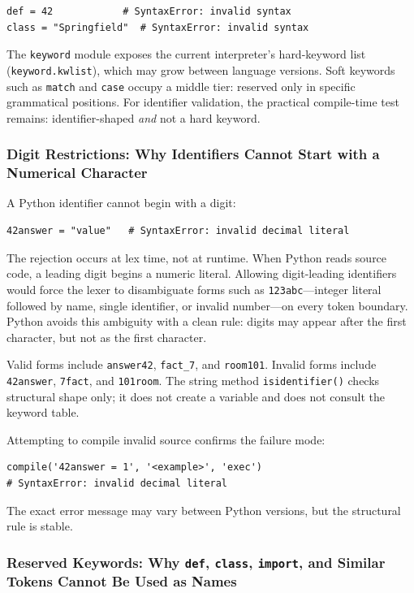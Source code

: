 \documentclass[a4paper,twoside]{report}
\begin{document}
\begin{verbatim}
def = 42            # SyntaxError: invalid syntax
class = "Springfield"  # SyntaxError: invalid syntax
\end{verbatim}

The \texttt{keyword} module exposes the current interpreter's hard-keyword list (\texttt{keyword.kwlist}), which may grow between language versions. Soft keywords such as \texttt{match} and \texttt{case} occupy a middle tier: reserved only in specific grammatical positions. For identifier validation, the practical compile-time test remains: identifier-shaped \emph{and} not a hard keyword.

\subsubsection{Digit Restrictions: Why Identifiers Cannot Start with a Numerical Character}

A Python identifier cannot begin with a digit:

\begin{verbatim}
42answer = "value"   # SyntaxError: invalid decimal literal
\end{verbatim}

The rejection occurs at lex time, not at runtime. When Python reads source code, a leading digit begins a numeric literal. Allowing digit-leading identifiers would force the lexer to disambiguate forms such as \texttt{123abc}---integer literal followed by name, single identifier, or invalid number---on every token boundary. Python avoids this ambiguity with a clean rule: digits may appear after the first character, but not as the first character.

Valid forms include \texttt{answer42}, \texttt{fact\_7}, and \texttt{room101}. Invalid forms include \texttt{42answer}, \texttt{7fact}, and \texttt{101room}. The string method \texttt{isidentifier()} checks structural shape only; it does not create a variable and does not consult the keyword table.

Attempting to compile invalid source confirms the failure mode:

\begin{verbatim}
compile('42answer = 1', '<example>', 'exec')
# SyntaxError: invalid decimal literal
\end{verbatim}

The exact error message may vary between Python versions, but the structural rule is stable.

\subsubsection{Reserved Keywords: Why \texttt{def}, \texttt{class}, \texttt{import}, and Similar Tokens Cannot Be Used as Names}
\end{document}
